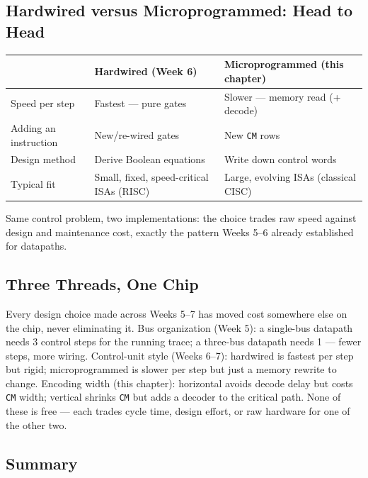 \documentclass[11pt]{article}
\begin{document}
\subsection{Hardwired versus Microprogrammed: Head to Head}

\begin{center}
\footnotesize
\begin{tabular}{@{}lll@{}}
\toprule
& \textbf{Hardwired (Week 6)} & \textbf{Microprogrammed (this chapter)} \\
\midrule
Speed per step & Fastest --- pure gates & Slower --- memory read (+ decode) \\
Adding an instruction & New/re-wired gates & New \texttt{CM} rows \\
Design method & Derive Boolean equations & Write down control words \\
Typical fit & Small, fixed, speed-critical ISAs (RISC) & Large, evolving ISAs (classical CISC) \\
\bottomrule
\end{tabular}
\end{center}

Same control problem, two implementations: the choice trades raw speed against design and maintenance cost, exactly the pattern Weeks 5--6 already established for datapaths.

\subsection{Three Threads, One Chip}

Every design choice made across Weeks 5--7 has moved cost somewhere else on the chip, never eliminating it. Bus organization (Week 5): a single-bus datapath needs 3 control steps for the running trace; a three-bus datapath needs 1 --- fewer steps, more wiring. Control-unit style (Weeks 6--7): hardwired is fastest per step but rigid; microprogrammed is slower per step but just a memory rewrite to change. Encoding width (this chapter): horizontal avoids decode delay but costs \texttt{CM} width; vertical shrinks \texttt{CM} but adds a decoder to the critical path. None of these is free --- each trades cycle time, design effort, or raw hardware for one of the other two.

\subsection{Summary}
\end{document}
